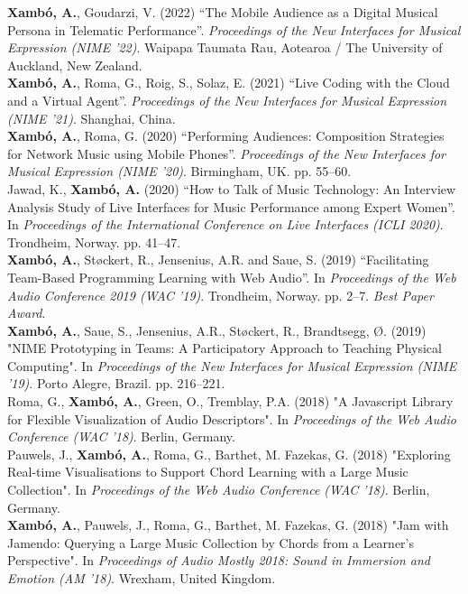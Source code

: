 \documentclass[10pt, a4paper]{article}
\newcommand{\years}[1]{\marginnote{\scriptsize #1}}
\begin{document}
{{{\years{2022}\textbf{Xambó, A.}, Goudarzi, V. (2022) ``The Mobile Audience as a Digital Musical Persona in Telematic Performance''. \emph{Proceedings of the New Interfaces for Musical Expression (NIME '22)}. Waipapa Taumata Rau, Aotearoa / The University of Auckland, New Zealand.}\\
{\years{2021}\textbf{Xambó, A.}, Roma, G., Roig, S., Solaz, E. (2021) ``Live Coding with the Cloud and a Virtual Agent''. \emph{Proceedings of the New Interfaces for Musical Expression (NIME '21)}. Shanghai, China.}\\
{\years{2020b}\textbf{Xambó, A.}, Roma, G. (2020) ``Performing Audiences: Composition Strategies for Network Music using Mobile Phones''. \emph{Proceedings of the New Interfaces for Musical Expression (NIME '20)}. Birmingham, UK. pp. 55--60.}\\
\years{2020a}Jawad, K., \textbf{Xambó, A.} (2020) ``How to Talk of Music Technology: An Interview Analysis Study of Live Interfaces for Music Performance among Expert Women''. In \emph{Proceedings of the International Conference on Live Interfaces (ICLI 2020)}. Trondheim, Norway. pp. 41--47.\\
\years{2019b}\textbf{Xambó, A.}, Støckert, R., Jensenius, A.R. and Saue, S. (2019) ``Facilitating Team-Based Programming Learning with Web Audio''. In \emph{Proceedings of the Web Audio Conference 2019 (WAC '19)}. Trondheim, Norway. pp. 2--7. \emph{Best Paper Award}.\\
\years{2019a}\textbf{Xambó, A.}, Saue, S., Jensenius, A.R., Støckert, R., Brandtsegg, Ø. (2019) "NIME Prototyping in Teams: A Participatory Approach to Teaching Physical Computing". In \emph{Proceedings of the New Interfaces for Musical Expression (NIME ’19)}. Porto Alegre, Brazil. pp. 216–221.\\
\years{2018f}Roma, G., \textbf{Xambó, A.}, Green, O., Tremblay, P.A. (2018) "A Javascript Library for Flexible Visualization of Audio Descriptors". In \emph{Proceedings of the Web Audio Conference (WAC '18)}. Berlin, Germany.\\
\years{2018e}Pauwels, J., \textbf{Xambó, A.}, Roma, G., Barthet, M. Fazekas, G. (2018) "Exploring Real-time Visualisations to Support Chord Learning with a Large Music Collection". In \emph{Proceedings of the Web Audio Conference (WAC '18)}. Berlin, Germany.\\
\years{2018d}\textbf{Xambó, A.}, Pauwels, J., Roma, G., Barthet, M. Fazekas, G. (2018) "Jam with Jamendo: Querying a Large Music Collection by Chords from a Learner’s Perspective". In \emph{Proceedings of Audio Mostly 2018: Sound in Immersion and Emotion (AM '18)}. Wrexham, United Kingdom. \\
}}
\end{document}
